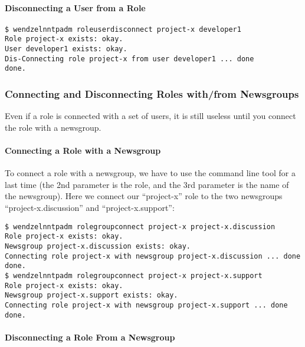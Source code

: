 \documentclass[12pt,fleqn,leqno]{scrbook}
\begin{document}
\hypertarget{disconnecting-a-user-from-a-role}{%
\paragraph{Disconnecting a User from a
Role}\label{disconnecting-a-user-from-a-role}}

\begin{verbatim}
$ wendzelnntpadm roleuserdisconnect project-x developer1
Role project-x exists: okay.
User developer1 exists: okay.
Dis-Connecting role project-x from user developer1 ... done
done.
\end{verbatim}

\hypertarget{connecting-and-disconnecting-roles-withfrom-newsgroups}{%
\subsubsection{Connecting and Disconnecting Roles with/from
Newsgroups}\label{connecting-and-disconnecting-roles-withfrom-newsgroups}}

Even if a role is connected with a set of users, it is still useless
until you connect the role with a newsgroup.

\hypertarget{connecting-a-role-with-a-newsgroup}{%
\paragraph{Connecting a Role with a
Newsgroup}\label{connecting-a-role-with-a-newsgroup}}

To connect a role with a newsgroup, we have to use the command line tool
for a last time (the 2nd parameter is the role, and the 3rd parameter is
the name of the newsgroup). Here we connect our ``project-x'' role to
the two newsgroups ``project-x.discussion'' and ``project-x.support'':

\begin{verbatim}
$ wendzelnntpadm rolegroupconnect project-x project-x.discussion
Role project-x exists: okay.
Newsgroup project-x.discussion exists: okay.
Connecting role project-x with newsgroup project-x.discussion ... done
done.
$ wendzelnntpadm rolegroupconnect project-x project-x.support
Role project-x exists: okay.
Newsgroup project-x.support exists: okay.
Connecting role project-x with newsgroup project-x.support ... done
done.
\end{verbatim}

\hypertarget{disconnecting-a-role-from-a-newsgroup}{%
\paragraph{Disconnecting a Role From a
Newsgroup}\label{disconnecting-a-role-from-a-newsgroup}}
\end{document}
